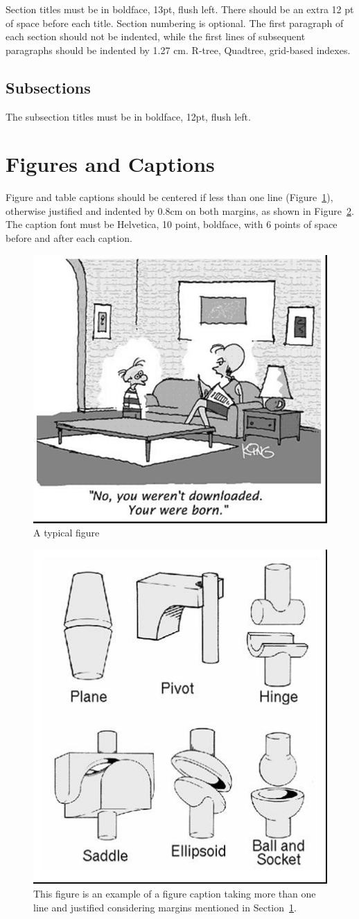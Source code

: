 \documentclass[12pt]{article}
\begin{document}
Section titles must be in boldface, 13pt, flush left. There should be an extra
12 pt of space before each title. Section numbering is optional. The first
paragraph of each section should not be indented, while the first lines of
subsequent paragraphs should be indented by 1.27 cm.
R-tree, Quadtree, grid-based indexes.

\subsection{Subsections}

The subsection titles must be in boldface, 12pt, flush left.

\section{Figures and Captions}\label{sec:figs}


Figure and table captions should be centered if less than one line
(Figure~\ref{fig:exampleFig1}), otherwise justified and indented by 0.8cm on
both margins, as shown in Figure~\ref{fig:exampleFig2}. The caption font must
be Helvetica, 10 point, boldface, with 6 points of space before and after each
caption.

\begin{figure}[ht]
  \centering
  \includegraphics[width=.5\textwidth]{fig1.jpg}
  \caption{A typical figure}
  \label{fig:exampleFig1}
\end{figure}

\begin{figure}[ht]
  \centering
  \includegraphics[width=.3\textwidth]{fig2.jpg}
  \caption{This figure is an example of a figure caption taking more than one
  line and justified considering margins mentioned in Section~\ref{sec:figs}.}
  \label{fig:exampleFig2}
\end{figure}
\end{document}

